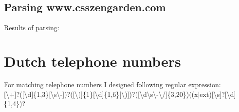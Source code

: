 \documentclass[a4paper,11pt]{article}
\begin{document}
\subsection{Parsing www.csszengarden.com}

Results of parsing:


\section{Dutch telephone numbers}
For matching telephone numbers I designed following regular expression:\\

[\textbackslash{}+]?([\textbackslash{}d]\{1,3\}[\textbackslash{}s\textbackslash{}-])?([\textbackslash{}(]\{1\}[\textbackslash{}d]\{1,6\}[\textbackslash{})])?([\textbackslash{}d\textbackslash{}s\textbackslash{}-\textbackslash{}/]\{3,20\})((x$|$ext)[\textbackslash{}s]?[\textbackslash{}d]\{1,4\})?

\
\end{document}
